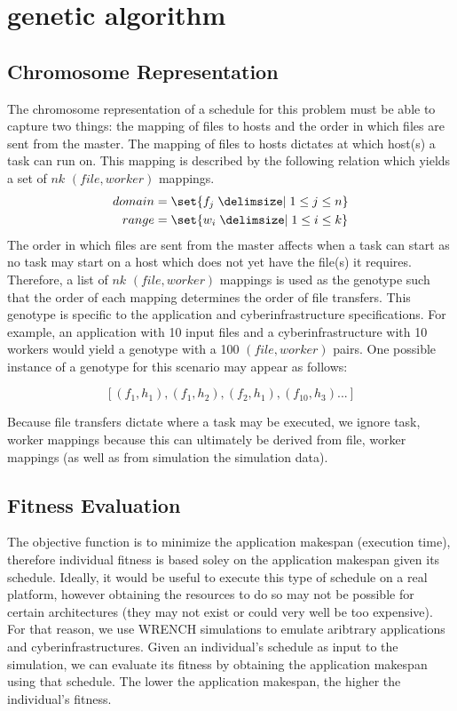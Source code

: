 \section{genetic algorithm}
\label{sec:genetic_algorithm}

\subsection*{Chromosome Representation}
The chromosome representation of a schedule for this problem must be able to
capture two things: the mapping of files to hosts and the order in which files
are sent from the master. The mapping of files to hosts dictates at which host(s)
a task can run on. This mapping is described by the following relation which yields a set
of $nk$ $(file, worker)$ mappings.
\begin{align}
  domain & = \set{f_j \given 1 \leq j \leq n} \nonumber \\
  range  & = \set{w_i \given 1 \leq i \leq k} \nonumber
\end{align}
The order in which files are sent from the master affects when a task can
start as no task may start on a host which does not yet have the file(s) it requires.
Therefore, a list of $nk$ $(file, worker)$ mappings is used as the genotype such that the order
of each mapping determines the order of file transfers.
This genotype is specific to the application and cyberinfrastructure specifications.
For example, an application with 10 input files and a cyberinfrastructure with 10 workers
would yield a genotype with a 100 $(file, worker)$ pairs. One possible instance of a genotype
for this scenario may appear as follows:

$$[(f_1, h_1),(f_1,h_2),(f_2,h_1),(f_{10}, h_3)...]$$

Because file transfers dictate where a task may be executed, we ignore task,
worker mappings because this can ultimately be derived from file, worker
mappings (as well as from simulation the simulation data).

\subsection*{Fitness Evaluation}
The objective function is to minimize the application makespan (execution time),
therefore individual fitness is based soley on the application makespan given
its schedule. Ideally, it would be useful to execute this type of schedule
on a real platform, however obtaining the resources to do so may not be
possible for certain architectures (they may not exist or could very well be
too expensive). For that reason, we use WRENCH simulations to emulate aribtrary
applications and cyberinfrastructures. Given an individual's schedule as input
to the simulation, we can evaluate its fitness by obtaining the application
makespan using that schedule. The lower the application makespan, the higher
the individual's fitness.

